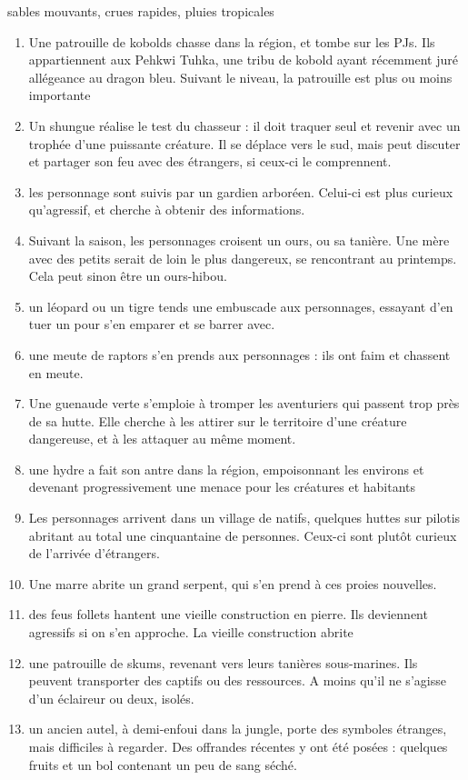 \documentclass[10pt,a4paper]{book}
\begin{document}
sables mouvants, crues rapides, pluies tropicales
\begin{enumerate}
\item Une patrouille de kobolds chasse dans la région, et tombe sur les PJs. Ils appartiennent aux Pehkwi Tuhka, une tribu de kobold ayant récemment juré allégeance au dragon bleu. Suivant le niveau, la patrouille est plus ou moins importante
\item Un shungue réalise le test du chasseur : il doit traquer seul et revenir avec un trophée d'une puissante créature. Il se déplace vers le sud, mais peut discuter et partager son feu avec des étrangers, si ceux-ci le comprennent.
\item les personnage sont suivis par un gardien arboréen. Celui-ci est plus curieux qu'agressif, et cherche à obtenir des informations.
\item Suivant la saison, les personnages croisent un ours, ou sa tanière. Une mère avec des petits serait de loin le plus dangereux, se rencontrant au printemps. Cela peut sinon être un ours-hibou.
\item un léopard ou un tigre tends une embuscade aux personnages, essayant d'en tuer un pour s'en emparer et se barrer avec.
\item une meute de raptors s'en prends aux personnages : ils ont faim et chassent en meute.
\item Une guenaude verte s'emploie à tromper les aventuriers qui passent trop près de sa hutte. Elle cherche à les attirer sur le territoire d'une créature dangereuse, et à les attaquer au même moment.
\item une hydre a fait son antre dans la région, empoisonnant les environs et devenant progressivement une menace pour les créatures et habitants
\item Les personnages arrivent dans un village de natifs, quelques huttes sur pilotis abritant au total une cinquantaine de personnes. Ceux-ci sont plutôt curieux de l'arrivée d'étrangers.
\item Une marre abrite un grand serpent, qui s'en prend à ces proies nouvelles.
\item des feus follets hantent une vieille construction en pierre. Ils deviennent agressifs si on s'en approche. La vieille construction abrite 
\item une patrouille de skums, revenant vers leurs tanières sous-marines. Ils peuvent transporter des captifs ou des ressources. A moins qu'il ne s'agisse d'un éclaireur ou deux, isolés.
\item un ancien autel, à demi-enfoui dans la jungle, porte des symboles étranges, mais difficiles à regarder. Des offrandes récentes y ont été posées : quelques fruits et un bol contenant un peu de sang séché.

\end{enumerate}
\end{document}
